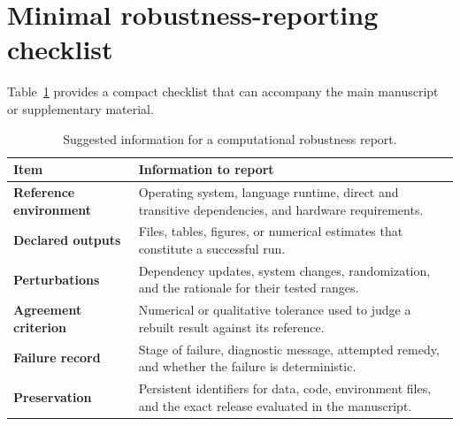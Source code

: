 \section{Minimal robustness-reporting checklist}

Table~\ref{tab:checklist} provides a compact checklist that can accompany the
main manuscript or supplementary material.

\begin{table}[htbp]
  \centering
  \caption{Suggested information for a computational robustness report.}
  \label{tab:checklist}
  \begin{singlespace}
  \small
  \begin{tabularx}{\textwidth}{@{}>{\bfseries}p{}X@{}}
    \toprule
    Item & Information to report \\
    \midrule
    Reference environment & Operating system, language runtime, direct and
      transitive dependencies, and hardware requirements. \\
    Declared outputs & Files, tables, figures, or numerical estimates that
      constitute a successful run. \\
    Perturbations & Dependency updates, system changes, randomization, and the
      rationale for their tested ranges. \\
    Agreement criterion & Numerical or qualitative tolerance used to judge a
      rebuilt result against its reference. \\
    Failure record & Stage of failure, diagnostic message, attempted remedy,
      and whether the failure is deterministic. \\
    Preservation & Persistent identifiers for data, code, environment files,
      and the exact release evaluated in the manuscript. \\
    \bottomrule
  \end{tabularx}
  \end{singlespace}
\end{table}
